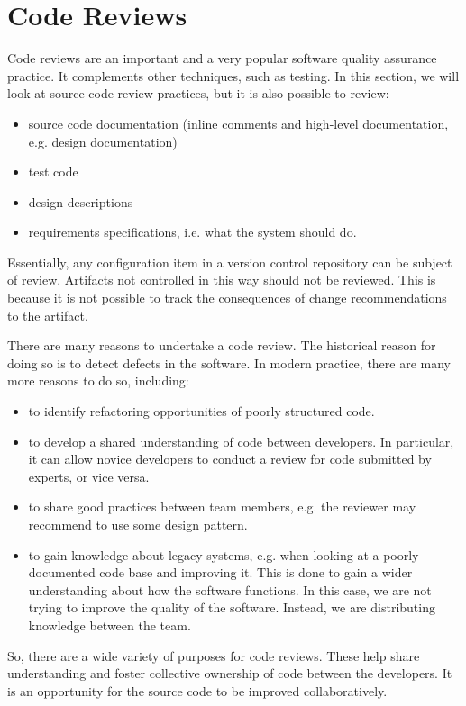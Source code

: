 \documentclass[a4paper, openany]{memoir}
\begin{document}
\chapter{Code Reviews}
Code reviews are an important and a very popular software quality assurance practice. It complements other techniques, such as testing. In this section, we will look at source code review practices, but it is also possible to review:
\begin{itemize}
    \item source code documentation (inline comments and high-level documentation, e.g. design documentation)
    \item test code
    \item design descriptions
    \item requirements specifications, i.e. what the system should do.
\end{itemize}
Essentially, any configuration item in a version control repository can be subject of review. Artifacts not controlled in this way should not be reviewed. This is because it is not possible to track the consequences of change recommendations to the artifact.

There are many reasons to undertake a code review. The historical reason for doing so is to detect defects in the software. In modern practice, there are many more reasons to do so, including:
\begin{itemize}
    \item to identify refactoring opportunities of poorly structured code.
    \item to develop a shared understanding of code between developers. In particular, it can allow novice developers to conduct a review for code submitted by experts, or vice versa.
    \item to share good practices between team members, e.g. the reviewer may recommend to use some design pattern.
    \item to gain knowledge about legacy systems, e.g. when looking at a poorly documented code base and improving it. This is done to gain a wider understanding about how the software functions. In this case, we are not trying to improve the quality of the software. Instead, we are distributing knowledge between the team.
\end{itemize}
So, there are a wide variety of purposes for code reviews. These help share understanding and foster collective ownership of code between the developers. It is an opportunity for the source code to be improved collaboratively.
\end{document}
